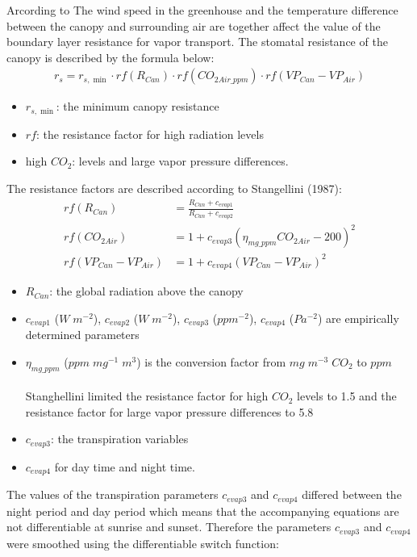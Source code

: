 \documentclass[a4paper]{article}
\numberwithin{equation}{section}
\begin{document}
Arcording to \cite{stanghellini1987transpiration}
 The wind speed in the greenhouse and the temperature difference between the canopy and surrounding air are together affect the value of the boundary layer resistance for vapor transport.
The stomatal resistance of the canopy is described by the formula below:
\begin{align*}
  r_s = r_{s,\min} \cdot rf(R_{Can}) \cdot rf(CO_{2Air\_ppm}) \cdot rf(VP_{Can} - VP_{Air})
\end{align*}
\begin{itemize}
    \item \(r_{s,\min}\): the minimum canopy resistance
    \item \(rf\): the resistance factor for high radiation levels
    \item high \(CO_2\): levels and large vapor pressure differences.
\end{itemize}
The resistance factors are described according to Stangellini (1987):
\begin{equation*}
  \begin{split}
    rf(R_{Can}) & = \frac{R_{Can} + c_{evap1}}{R_{Can} + c_{evap2}} \\
    rf(CO_{2Air}) & = 1 + {c_{evap3} (\eta_{mg\_ppm} CO_{2Air} - 200)}^2 \\
    rf(VP_{Can} - VP_{Air}) & = 1 + {c_{evap4} (VP_{Can} - VP_{Air})}^2
  \end{split}
\end{equation*}
\begin{itemize}
    \item \(R_{Can}\): the global radiation above the canopy
    \item \(c_{evap1}\) (\(W\;m^{-2}\)), \(c_{evap2}\) (\(W\;m^{-2}\)), \(c_{evap3}\) (\(ppm^{-2}\)), \(c_{evap4}\) (\(Pa^{-2}\)) are empirically determined parameters
    \item \(\eta_{mg\_ppm}\) (\(ppm\;mg^{-1}\;m^3\)) is the conversion factor from \(mg\;m^{-3}\;CO_2\) to \(ppm\)\\\\
    Stanghellini limited the resistance factor for high \(CO_2\) levels to 1.5 and the resistance factor for large vapor pressure differences to 5.8
    \item \(c_{evap3}\): the transpiration variables
    \item \(c_{evap4}\) for day time and night time.
\end{itemize}
The values of the transpiration parameters \(c_{evap3}\) and \(c_{evap4}\) differed between the night period and day period which means that the accompanying equations are not differentiable at sunrise and sunset. Therefore the parameters \(c_{evap3}\) and \(c_{evap4}\) were smoothed using the differentiable switch function:
\end{document}
